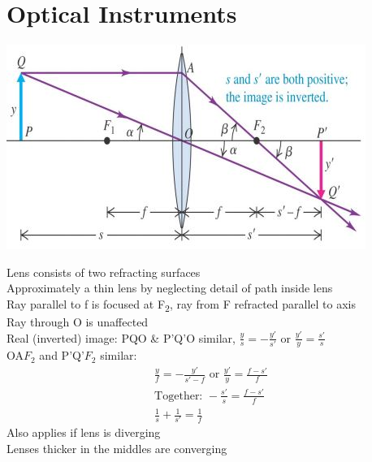 \documentclass[a4paper, 11pt, fleqn, normalem]{report}
\begin{document}
\section{Optical Instruments}
\includegraphics[scale=0.89]{Optic.jpg}

Lens consists of two refracting surfaces \\
Approximately a thin lens by neglecting detail of path inside lens \\
Ray parallel to f is focused at F\textsubscript{2}, ray from F refracted parallel to axis \\
Ray through O is unaffected \\
Real (inverted) image: PQO \& P'Q'O similar, $\frac{y}{s} = -\frac{y'}{s'}$ or $\frac{y'}{y} = \frac{s'}{s}$ \\
OA$F_{2}$ and P'Q'$F_{2}$ similar:
\begin{gather*}
    \frac{y}{f} = -\frac{y'}{s' - f}\text{ or }\frac{y'}{y} = \frac{f - s'}{f} \\
    \text{Together: }-\frac{s'}{s} = \frac{f - s'}{f} \\
    \frac{1}{s} + \frac{1}{s'} = \frac{1}{f}
\end{gather*}
Also applies if lens is diverging \\
Lenses thicker in the middles are converging
\end{document}
